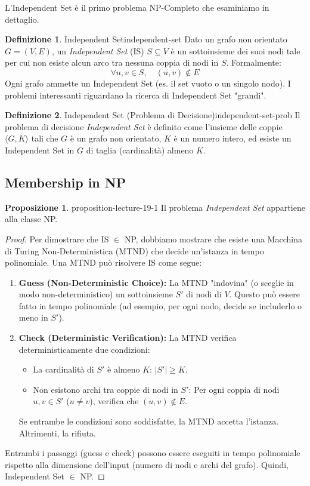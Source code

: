 \documentclass[a4paper]{article}
\theoremstyle{definition} %
\newtheorem{definition}{Definizione}[section]
\newtheorem{proposition}{Proposizione}[section]
\theoremstyle{definition} %
\begin{document}
L'Independent Set è il primo problema NP-Completo che esaminiamo in dettaglio.

\begin{definition}{Independent Set}{independent-set}
Dato un grafo non orientato $G=(V, E)$, un \emph{Independent Set} (IS) $S \subseteq V$ è un sottoinsieme dei suoi nodi tale per cui non esiste alcun arco tra nessuna coppia di nodi in $S$. Formalmente:
\[ \forall u, v \in S, \quad (u, v) \notin E \]
Ogni grafo ammette un Independent Set (es. il set vuoto o un singolo nodo). I problemi interessanti riguardano la ricerca di Independent Set "grandi".
\end{definition}

\begin{definition}{Independent Set (Problema di Decisione)}{independent-set-prob}
Il problema di decisione \emph{Independent Set} è definito come l'insieme delle coppie $\langle G, K \rangle$ tali che $G$ è un grafo non orientato, $K$ è un numero intero, ed esiste un Independent Set in $G$ di taglia (cardinalità) almeno $K$.
\end{definition}

\subsection{Membership in NP}

\begin{proposition}{}{{ proposition-lecture-19-1 }}
Il problema \emph{Independent Set} appartiene alla classe NP.
\end{proposition}

\begin{proof}
Per dimostrare che IS $\in$ NP, dobbiamo mostrare che esiste una Macchina di Turing Non-Deterministica (MTND) che decide un'istanza in tempo polinomiale.
Una MTND può risolvere IS come segue:
\begin{enumerate}
    \item \textbf{Guess (Non-Deterministic Choice):} La MTND "indovina" (o sceglie in modo non-deterministico) un sottoinsieme $S'$ di nodi di $V$. Questo può essere fatto in tempo polinomiale (ad esempio, per ogni nodo, decide se includerlo o meno in $S'$).
    \item \textbf{Check (Deterministic Verification):} La MTND verifica deterministicamente due condizioni:
    \begin{itemize}
        \item La cardinalità di $S'$ è almeno $K$: $|S'| \ge K$.
        \item Non esistono archi tra coppie di nodi in $S'$: Per ogni coppia di nodi $u, v \in S'$ ($u \ne v$), verifica che $(u, v) \notin E$.
    \end{itemize}
    Se entrambe le condizioni sono soddisfatte, la MTND accetta l'istanza. Altrimenti, la rifiuta.
\end{enumerate}
Entrambi i passaggi (guess e check) possono essere eseguiti in tempo polinomiale rispetto alla dimensione dell'input (numero di nodi e archi del grafo). Quindi, Independent Set $\in$ NP.
\end{proof}
\end{document}
